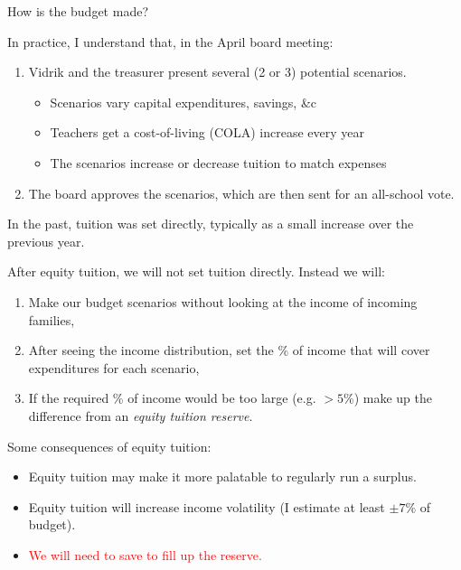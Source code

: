 \documentclass[8pt]{beamer}
\begin{document}
\begin{frame}{How is the budget made?}

%

In practice, I understand that, in the April board meeting:
%
\begin{enumerate}
%
\item Vidrik and the treasurer present several (2 or 3) potential scenarios.
\begin{itemize}
    \item Scenarios vary capital expenditures, savings, \&c
    \item Teachers get a cost-of-living (COLA) increase every year
    \item The scenarios increase or decrease tuition to match expenses
\end{itemize}
\item The board approves the scenarios, which are then sent for an all-school
vote.
%
\end{enumerate}
%

In the past, tuition was set directly, typically as a small increase over
the previous year.

After equity tuition, we will not set tuition directly.  Instead we will:
%
\begin{enumerate}
%
\item Make our budget scenarios without looking at the income of incoming
families,
\item After seeing the income distribution, set the \% of income that will cover
expenditures for each scenario,
\item If the required \% of income would be too large (e.g. $> 5\%$)
make up the difference from an {\em equity tuition reserve}.
%
\end{enumerate}
%
Some consequences of equity tuition:
%
\begin{itemize}
%
\item Equity tuition may make it more palatable to regularly run a surplus.
\item Equity tuition will increase income volatility
    (I estimate at least $\pm 7\%$ of budget).
\item \textcolor{red}{We will need to save to fill up the reserve.}
%
\end{itemize}
%
\end{frame}
\end{document}

